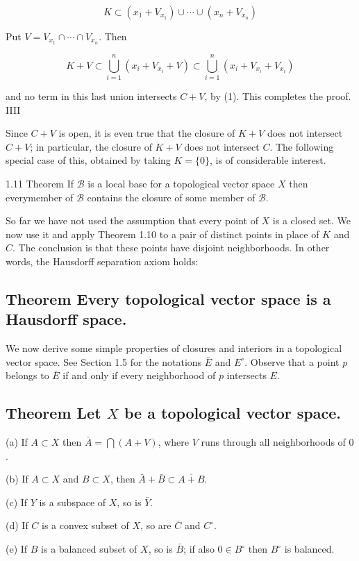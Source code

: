 \documentclass[10pt]{article}
\begin{document}
$$
K \subset\left(x_{1}+V_{x_{1}}\right) \cup \cdots \cup\left(x_{n}+V_{x_{n}}\right)
$$

Put $V=V_{x_{1}} \cap \cdots \cap V_{x_{n}}$. Then

$$
K+V \subset \bigcup_{i=1}^{n}\left(x_{i}+V_{x_{i}}+V\right) \subset \bigcup_{i=1}^{n}\left(x_{i}+V_{x_{i}}+V_{x_{i}}\right)
$$

and no term in this last union intersects $C+V$, by (1). This completes the proof. IIII

Since $C+V$ is open, it is even true that the closure of $K+V$ does not intersect $C+V$; in particular, the closure of $K+V$ does not intersect $C$. The following special case of this, obtained by taking $K=\{0\}$, is of considerable interest.

1.11 Theorem If $\mathscr{B}$ is a local base for a topological vector space $X$ then everymember of $\mathscr{B}$ contains the closure of some member of $\mathscr{B}$.

So far we have not used the assumption that every point of $X$ is a closed set. We now use it and apply Theorem 1.10 to a pair of distinct points in place of $K$ and $C$. The conclusion is that these points have disjoint neighborhoods. In other words, the Hausdorff separation axiom holds:

\subsection{Theorem Every topological vector space is a Hausdorff space.}
We now derive some simple properties of closures and interiors in a topological vector space. See Section 1.5 for the notations $\bar{E}$ and $E^{\circ}$. Observe that a point $p$ belongs to $\bar{E}$ if and only if every neighborhood of $p$ intersects $E$.

\subsection{Theorem Let $X$ be a topological vector space.}
(a) If $A \subset X$ then $\bar{A}=\bigcap(A+V)$, where $V$ runs through all neighborhoods of 0 .

(b) If $A \subset X$ and $B \subset X$, then $\bar{A}+\bar{B} \subset \overline{A+B}$.

(c) If $Y$ is a subspace of $X$, so is $\bar{Y}$.

(d) If $C$ is a convex subset of $X$, so are $\bar{C}$ and $C^{\circ}$.

(e) If $B$ is a balanced subset of $X$, so is $\bar{B}$; if also $0 \in B^{\circ}$ then $B^{\circ}$ is balanced.
\end{document}
